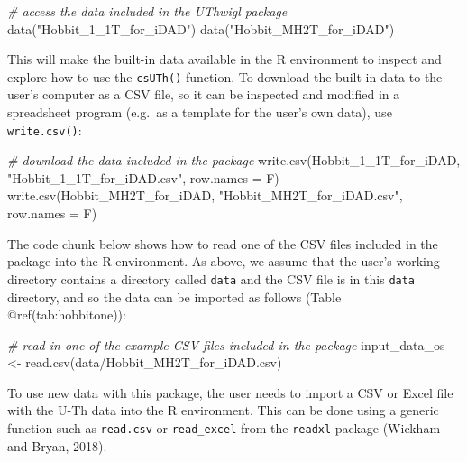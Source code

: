 \documentclass[]{elsarticle} %
\newenvironment{Shaded}{\begin{snugshade}}{\end{snugshade}}
\newcommand{\AttributeTok}[1]{\textcolor[rgb]{0.77,0.63,0.00}{#1}}
\newcommand{\CommentTok}[1]{\textcolor[rgb]{0.56,0.35,0.01}{\textit{#1}}}
\newcommand{\FunctionTok}[1]{\textcolor[rgb]{0.00,0.00,0.00}{#1}}
\newcommand{\NormalTok}[1]{#1}
\newcommand{\OtherTok}[1]{\textcolor[rgb]{0.56,0.35,0.01}{#1}}
\newcommand{\StringTok}[1]{\textcolor[rgb]{0.31,0.60,0.02}{#1}}
\begin{document}
\begin{Shaded}
\begin{Highlighting}[]
\CommentTok{\# access the data included in the UThwigl package}
\FunctionTok{data}\NormalTok{(}\StringTok{"Hobbit\_1\_1T\_for\_iDAD"}\NormalTok{)}
\FunctionTok{data}\NormalTok{(}\StringTok{"Hobbit\_MH2T\_for\_iDAD"}\NormalTok{)}
\end{Highlighting}
\end{Shaded}

This will make the built-in data available in the R environment to inspect and explore how to use the \texttt{csUTh()} function.
To download the built-in data to the user's computer as a CSV file, so it can be inspected and modified in a spreadsheet program (e.g.~as a template for the user's own data), use \texttt{write.csv()}:

\begin{Shaded}
\begin{Highlighting}[]
\CommentTok{\# download the data included in the package}
\FunctionTok{write.csv}\NormalTok{(Hobbit\_1\_1T\_for\_iDAD, }\StringTok{"Hobbit\_1\_1T\_for\_iDAD.csv"}\NormalTok{, }\AttributeTok{row.names =}\NormalTok{ F)}
\FunctionTok{write.csv}\NormalTok{(Hobbit\_MH2T\_for\_iDAD, }\StringTok{"Hobbit\_MH2T\_for\_iDAD.csv"}\NormalTok{, }\AttributeTok{row.names =}\NormalTok{ F)}
\end{Highlighting}
\end{Shaded}

The code chunk below shows how to read one of the CSV files included in the package into the R environment. As above, we assume that the user's working directory contains a directory called \texttt{data} and the CSV file is in this \texttt{data} directory, and so the data can be imported as follows (Table @ref(tab:hobbitone)):

\begin{Shaded}
\begin{Highlighting}[]
\CommentTok{\# read in one of the example CSV files included in the package}
\NormalTok{input\_data\_os }\OtherTok{\textless{}{-}}
  \FunctionTok{read.csv}\NormalTok{(}\StringTok{\textquotesingle{}data/Hobbit\_MH2T\_for\_iDAD.csv\textquotesingle{}}\NormalTok{)}
\end{Highlighting}
\end{Shaded}

To use new data with this package, the user needs to import a CSV or Excel file with the U-Th data into the R environment. This can be done using a generic function such as \texttt{read.csv} or \texttt{read\_excel} from the \texttt{readxl} package (Wickham and Bryan, 2018).
\end{document}
